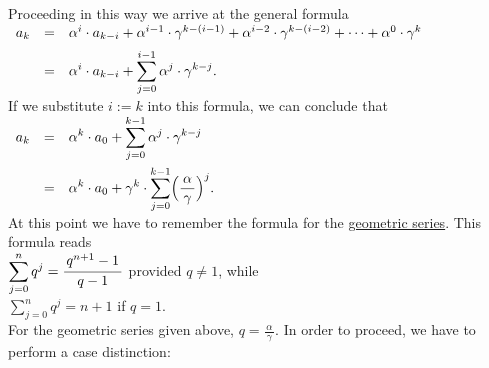 Proceeding in this way we arrive at the general formula
\\[0.2cm]
\hspace*{1.3cm}
$
\begin{array}[b]{lcl}
a_k & = & \alpha^{i} \cdot a_{k-i} + \alpha^{i-1} \cdot \gamma^{k-(i-1)} + \alpha^{i-2} \cdot \gamma^{k-(i-2)}
          + \cdots + \alpha^0 \cdot \gamma^k 
          \\[0.2cm]
    & = & \displaystyle \alpha^{i} \cdot a_{k-i} + \sum\limits_{j=0}^{i-1} \alpha^{j} \cdot \gamma^{k-j}. \\[0.2cm]
\end{array}
$
\\[0.2cm]
If we substitute $i := k$ into this formula, we can conclude that
\\[0.2cm]
\hspace*{1.3cm}
$\displaystyle 
\begin{array}[b]{lcl}
a_k & = & \displaystyle\alpha^{k} \cdot a_{0} + \sum\limits_{j=0}^{k-1} \alpha^{j} \cdot \gamma^{k-j} \\[0.5cm]
    & = & \displaystyle\alpha^{k} \cdot a_{0} + \gamma^k \cdot \sum\limits_{j=0}^{k-1} \Bigl(\displaystyle\frac{\,\alpha\,}{\gamma}\Bigr)^j.  \\[0.2cm]
\end{array}
$
\\[0.2cm]
At this point we have to remember the formula for the
\href{https://en.wikipedia.org/wiki/Geometric_series}{geometric series}.  
This formula reads 
\\[0.2cm]
\hspace*{1.3cm}
$\displaystyle\sum\limits_{j=0}^n q^j = \bruch{q^{n+1} - 1}{q - 1}$ \quad provided $q \not= 1$, while
\\[0.2cm]
\hspace*{1.3cm}
$\displaystyle\sum\limits_{j=0}^n q^j = n+1$ \quad if $q = 1$.
\\[0.2cm]
For the geometric series given above, $q = \displaystyle\frac{\,\alpha\,}{\gamma}$.  
In order to proceed, we have to perform a case distinction:
